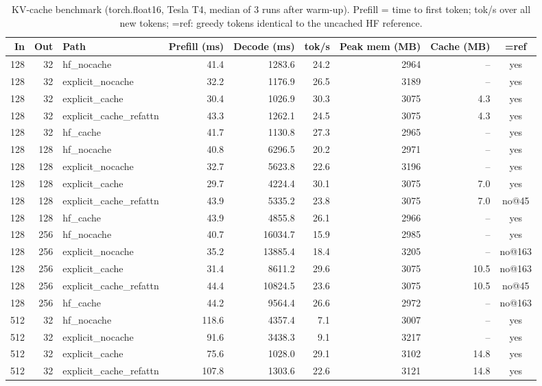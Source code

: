 \begin{table}[t]\centering\caption{KV-cache benchmark (torch.float16, Tesla T4, median of 3 runs after warm-up). Prefill = time to first token; tok/s over all new tokens; =ref: greedy tokens identical to the uncached HF reference.}\label{tab:kv}
\begin{tabular}{rrlrrrrrc}\toprule In & Out & Path & Prefill (ms) & Decode (ms) & tok/s & Peak mem (MB) & Cache (MB) & =ref\\\midrule
128 & 32 & hf\_nocache & 41.4 & 1283.6 & 24.2 & 2964 & -- & yes\\
128 & 32 & explicit\_nocache & 32.2 & 1176.9 & 26.5 & 3189 & -- & yes\\
128 & 32 & explicit\_cache & 30.4 & 1026.9 & 30.3 & 3075 & 4.3 & yes\\
128 & 32 & explicit\_cache\_refattn & 43.3 & 1262.1 & 24.5 & 3075 & 4.3 & yes\\
128 & 32 & hf\_cache & 41.7 & 1130.8 & 27.3 & 2965 & -- & yes\\
\midrule
128 & 128 & hf\_nocache & 40.8 & 6296.5 & 20.2 & 2971 & -- & yes\\
128 & 128 & explicit\_nocache & 32.7 & 5623.8 & 22.6 & 3196 & -- & yes\\
128 & 128 & explicit\_cache & 29.7 & 4224.4 & 30.1 & 3075 & 7.0 & yes\\
128 & 128 & explicit\_cache\_refattn & 43.9 & 5335.2 & 23.8 & 3075 & 7.0 & no@45\\
128 & 128 & hf\_cache & 43.9 & 4855.8 & 26.1 & 2966 & -- & yes\\
\midrule
128 & 256 & hf\_nocache & 40.7 & 16034.7 & 15.9 & 2985 & -- & yes\\
128 & 256 & explicit\_nocache & 35.2 & 13885.4 & 18.4 & 3205 & -- & no@163\\
128 & 256 & explicit\_cache & 31.4 & 8611.2 & 29.6 & 3075 & 10.5 & no@163\\
128 & 256 & explicit\_cache\_refattn & 44.4 & 10824.5 & 23.6 & 3075 & 10.5 & no@45\\
128 & 256 & hf\_cache & 44.2 & 9564.4 & 26.6 & 2972 & -- & no@163\\
\midrule
512 & 32 & hf\_nocache & 118.6 & 4357.4 & 7.1 & 3007 & -- & yes\\
512 & 32 & explicit\_nocache & 91.6 & 3438.3 & 9.1 & 3217 & -- & yes\\
512 & 32 & explicit\_cache & 75.6 & 1028.0 & 29.1 & 3102 & 14.8 & yes\\
512 & 32 & explicit\_cache\_refattn & 107.8 & 1303.6 & 22.6 & 3121 & 14.8 & yes\\

\end{tabular}
\end{table}
